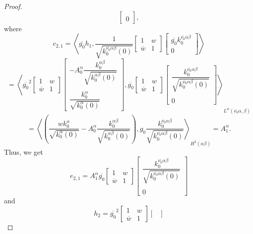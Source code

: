 \documentclass[reqno,11pt,centertags]{article}
\theoremstyle{definition}
\def\a{\alpha}
\def\b{\beta}
\begin{document}
\begin{proof}
$$\begin{bmatrix}
\\
0
\end{bmatrix}
,
$$
where
$$
c_{2,1}=
\left\langle
\overline{g_0}h_1
,
\dfrac{1}{\sqrt{k^{\overline{\nu_0}\alpha\b}_0(0)}}
\begin{bmatrix}
1 & w \\
\overline{w} & 1
\end{bmatrix}
\begin{bmatrix}
\overline{g_0} k^{\overline{\nu_0}\alpha\b}_0
\\
0
\end{bmatrix}
\right\rangle
$$
$$
=
\left\langle
\overline{g_0}^2
\begin{bmatrix}
1 & w \\
\overline{w} & 1
\end{bmatrix}
\begin{bmatrix}
-A^\a_0\dfrac{k^{{\alpha\b}}_0}{\sqrt{k^{{\alpha\b}}_0(0)}}
\\ \\
\dfrac{k^\a_0}{\sqrt{k^\a_0(0)}}
\end{bmatrix}
,
\overline{g_0}
\begin{bmatrix}
1 & w \\
\overline{w} & 1
\end{bmatrix}
\begin{bmatrix}
\dfrac{k^{\overline{\nu_0}\alpha\b}_0}{\sqrt{k^{\overline{\nu_0}\alpha\b}_0(0)}}
\\ \\
0
\end{bmatrix}
\right\rangle
_{L^w(\overline{\nu_0}\a,\b)}
$$
$$
=
\left\langle
\left(
\dfrac{wk^\a_0}{\sqrt{k^\a_0(0)}}
-A^\a_0\dfrac{k^{{\alpha\b}}_0}{\sqrt{k^{{\alpha\b}}_0(0)}}
\right)
,
g_0
\dfrac{k^{\overline{\nu_0}\alpha\b}_0}{\sqrt{k^{\overline{\nu_0}\alpha\b}_0(0)}}
\right\rangle
_{H^2(\a\b)}
=A^\a_1.
$$
Thus, we get
$$
e_{2,1}=
A^\a_1
\overline{g_0}
\begin{bmatrix}
1 & w \\
\overline{w} & 1
\end{bmatrix}
\begin{bmatrix}
\dfrac{k^{\overline{\nu_0}\alpha\b}_0}{\sqrt{k^{\overline{\nu_0}\alpha\b}_0(0)}}
\\ \\
0
\end{bmatrix}
$$
and
$$
h_2=
\overline{g_0}^2
\begin{bmatrix}
1 & w \\
\overline{w} & 1
\end{bmatrix}
\begin{bmatrix}

\end{bmatrix}$$
\end{proof}
\end{document}
